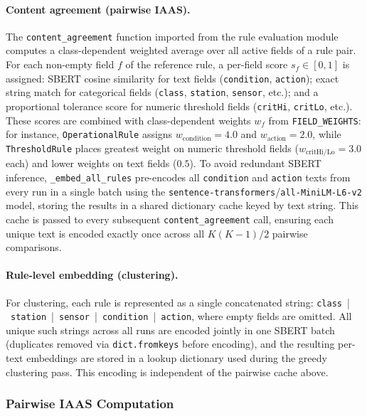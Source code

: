 ﻿\documentclass[11pt]{article}
\begin{document}
\paragraph{Content agreement (pairwise IAAS).}
The \texttt{content\_agreement} function imported from
the rule evaluation module computes a class-dependent weighted
average over all active fields of a rule pair.
For each non-empty field $f$ of the reference rule, a per-field score
$s_f \in [0,1]$ is assigned: SBERT cosine similarity for text fields
(\texttt{condition}, \texttt{action}); exact string match for categorical fields
(\texttt{class}, \texttt{station}, \texttt{sensor}, etc.); and a proportional
tolerance score for numeric threshold fields (\texttt{critHi}, \texttt{critLo},
etc.).
These scores are combined with class-dependent weights $w_f$ from
\texttt{FIELD\_WEIGHTS}: for instance, \texttt{OperationalRule} assigns
$w_{\text{condition}}=4.0$ and $w_{\text{action}}=2.0$, while
\texttt{ThresholdRule} places greatest weight on numeric threshold fields
($w_{\text{critHi/Lo}}=3.0$ each) and lower weights on text fields ($0.5$).
To avoid redundant SBERT inference, \texttt{\_embed\_all\_rules} pre-encodes all
\texttt{condition} and \texttt{action} texts from every run in a single batch
using the \texttt{sentence-transformers}/\texttt{all-MiniLM-L6-v2} model, storing
the results in a shared dictionary cache keyed by text string.
This cache is passed to every subsequent \texttt{content\_agreement} call,
ensuring each unique text is encoded exactly once across all $K(K{-}1)/2$
pairwise comparisons.

\paragraph{Rule-level embedding (clustering).}
For clustering, each rule is represented as a single concatenated string:
\texttt{class}~|~\texttt{station}~|~\texttt{sensor}~|~\texttt{condition}~|~\texttt{action},
where empty fields are omitted.
All unique such strings across all runs are encoded jointly in one SBERT batch
(duplicates removed via \texttt{dict.fromkeys} before encoding), and the
resulting per-text embeddings are stored in a lookup dictionary used during the
greedy clustering pass.
This encoding is independent of the pairwise cache above.

\subsubsection{Pairwise IAAS Computation}
\end{document}
